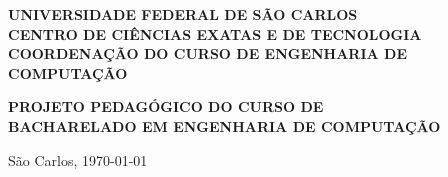 \documentclass[11pt,a4paper]{report}
\begin{document}
\begin{titlepage}
    \thispagestyle{empty}

    \begin{center}

    {\LARGE \textbf{UNIVERSIDADE FEDERAL DE SÃO CARLOS}}
        \\
        {\Large \textbf{CENTRO DE CIÊNCIAS EXATAS E DE TECNOLOGIA}} \\
        {\large \textbf{COORDENAÇÃO DO CURSO DE ENGENHARIA DE COMPUTAÇÃO}}  \\

        \vspace{8cm}

        {\Large \textbf{PROJETO PEDAGÓGICO DO
        CURSO DE \\ BACHARELADO EM ENGENHARIA DE COMPUTAÇÃO}} \\
        \vspace{8cm}

        {\Large São Carlos, \today}
    \end{center}
\end{titlepage}
\end{document}
